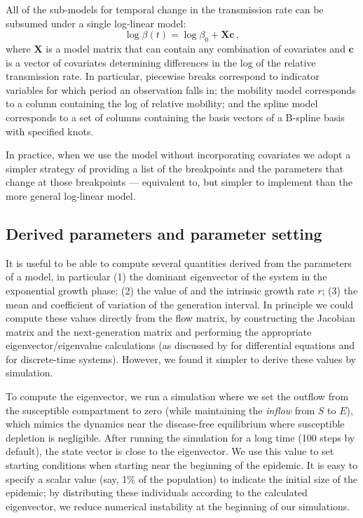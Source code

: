 \documentclass[12pt]{article}\usepackage[]{graphicx}\usepackage[]{color}
\begin{document}
All of the sub-models for temporal change in the transmission rate can be subsumed under a single log-linear model:
\begin{equation}\label{eq:betamodel}
\log \beta(t) = \log \beta_0 + \boldsymbol{X}\boldsymbol{c}
\,,
\end{equation}
where $\boldsymbol{X}$ is a model matrix that can contain any combination of covariates and $\boldsymbol{c}$ is a vector of covariates determining differences in the log of the relative transmission rate.
In particular, piecewise breaks correspond to indicator variables for which period an observation falls in; the mobility model corresponds to a column containing the log of relative mobility; and the spline model corresponds to a set of columns containing the basis vectors of a B-spline basis with specified knots.

In practice, when we use the model without incorporating covariates we adopt a simpler strategy of providing a list of the breakpoints and the parameters that change at those breakpoints --- equivalent to, but simpler to implement than the more general log-linear model.


\subsection*{Derived parameters and parameter setting}

It is useful to be able to compute several quantities derived from the parameters of a model, in particular (1) the dominant eigenvector of the system in the exponential growth phase; (2) the value of \Rzero and the intrinsic growth rate $r$; (3) the mean and coefficient of variation of the generation interval. 
In principle we could compute these values directly from the flow matrix, by constructing the Jacobian matrix and the next-generation matrix and performing the appropriate eigenvector/eigenvalue calculations (as discussed by \cite{VandWatm02} for differential equations and \cite{Casw00} for discrete-time systems). However, we found it simpler to derive these values by simulation.

To compute the eigenvector, we run a simulation where we set the outflow from the susceptible compartment to zero (while maintaining the \emph{inflow} from $S$ to $E$), which mimics the dynamics near the disease-free equilibrium where susceptible depletion is negligible. After running the simulation for a long time (100 steps by default), the state vector is close to the eigenvector.  
We use this value to set starting conditions when starting near the beginning of the epidemic. 
It is easy to specify a scalar value (say, 1\% of the population) to indicate the initial size of the epidemic; by distributing these individuals according to the calculated eigenvector, we reduce numerical instability at the beginning of our simulations. 
\end{document}
